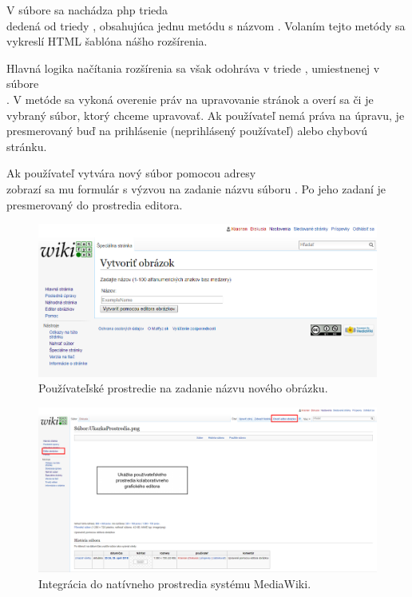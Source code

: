 V súbore  sa nachádza php trieda \\
 dedená od triedy , obsahujúca jednu metódu s názvom . Volaním tejto metódy sa vykreslí HTML šablóna nášho rozšírenia.

Hlavná logika načítania rozšírenia sa však odohráva v triede , umiestnenej v súbore \\
. V metóde  sa vykoná overenie práv na upravovanie stránok a overí sa či je vybraný súbor, ktorý chceme upravovať. Ak používateľ nemá práva na úpravu, je presmerovaný buď na prihlásenie (neprihlásený používateľ) alebo chybovú stránku.

Ak používateľ vytvára nový súbor pomocou adresy \\
 zobrazí sa mu formulár s výzvou na zadanie názvu súboru . Po jeho zadaní je presmerovaný do prostredia editora.

\begin{figure}[H]
	\centerline{\includegraphics[width=1\textwidth]{images/results/base-new}}
	\caption{Používateľské prostredie na zadanie názvu nového obrázku.}
	\label{obr:base-new}
\end{figure}

\begin{figure}[H]
	\centerline{\includegraphics[width=1\textwidth]{images/results/base-integration}}
	\caption{Integrácia do natívneho prostredia systému MediaWiki.}
	\label{obr:base-integration}
\end{figure}


